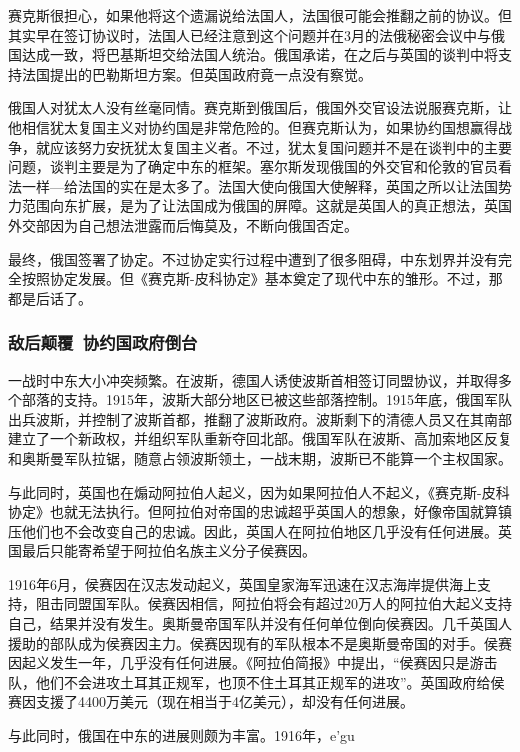 \documentclass{article}
\begin{document}
赛克斯很担心，如果他将这个遗漏说给法国人，法国很可能会推翻之前的协议。但其实早在签订协议时，法国人已经注意到这个问题并在3月的法俄秘密会议中与俄国达成一致，将巴基斯坦交给法国人统治。俄国承诺，在之后与英国的谈判中将支持法国提出的巴勒斯坦方案。但英国政府竟一点没有察觉。

俄国人对犹太人没有丝毫同情。赛克斯到俄国后，俄国外交官设法说服赛克斯，让他相信犹太复国主义对协约国是非常危险的。但赛克斯认为，如果协约国想赢得战争，就应该努力安抚犹太复国主义者。不过，犹太复国问题并不是在谈判中的主要问题，谈判主要是为了确定中东的框架。塞尔斯发现俄国的外交官和伦敦的官员看法一样---给法国的实在是太多了。法国大使向俄国大使解释，英国之所以让法国势力范围向东扩展，是为了让法国成为俄国的屏障。这就是英国人的真正想法，英国外交部因为自己想法泄露而后悔莫及，不断向俄国否定。

最终，俄国签署了协定。不过协定实行过程中遭到了很多阻碍，中东划界并没有完全按照协定发展。但《赛克斯-皮科协定》基本奠定了现代中东的雏形。不过，那都是后话了。

\subsubsection{敌后颠覆\ 协约国政府倒台}
一战时中东大小冲突频繁。在波斯，德国人诱使波斯首相签订同盟协议，并取得多个部落的支持。1915年，波斯大部分地区已被这些部落控制。1915年底，俄国军队出兵波斯，并控制了波斯首都，推翻了波斯政府。波斯剩下的清德人员又在其南部建立了一个新政权，并组织军队重新夺回北部。俄国军队在波斯、高加索地区反复和奥斯曼军队拉锯，随意占领波斯领土，一战末期，波斯已不能算一个主权国家。

与此同时，英国也在煽动阿拉伯人起义，因为如果阿拉伯人不起义，《赛克斯-皮科协定》也就无法执行。但阿拉伯对帝国的忠诚超乎英国人的想象，好像帝国就算镇压他们也不会改变自己的忠诚。因此，英国人在阿拉伯地区几乎没有任何进展。英国最后只能寄希望于阿拉伯名族主义分子侯赛因。

1916年6月，侯赛因在汉志发动起义，英国皇家海军迅速在汉志海岸提供海上支持，阻击同盟国军队。侯赛因相信，阿拉伯将会有超过20万人的阿拉伯大起义支持自己，结果并没有发生。奥斯曼帝国军队并没有任何单位倒向侯赛因。几千英国人援助的部队成为侯赛因主力。侯赛因现有的军队根本不是奥斯曼帝国的对手。侯赛因起义发生一年，几乎没有任何进展。《阿拉伯简报》中提出，“侯赛因只是游击队，他们不会进攻土耳其正规军，也顶不住土耳其正规军的进攻”。英国政府给侯赛因支援了4400万美元（现在相当于4亿美元），却没有任何进展。

与此同时，俄国在中东的进展则颇为丰富。1916年，e'gu
\end{document}

